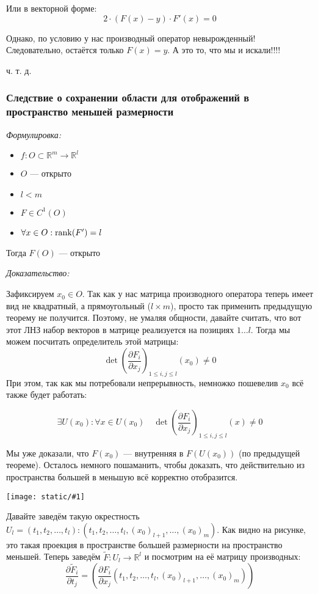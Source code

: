 \documentclass{article}
\def\image#1{\texttt{[image: static/\#1]}}
\begin{document}
Или в векторной форме:
\[2 \cdot (F(x) - y) \cdot F'(x) = 0\]

Однако, по условию у нас производный оператор невырожденный! Следовательно, остаётся только $F(x) = y$. А это то, что мы и искали!!!!

ч. т. д.


\subsubsection{Следствие о сохранении области для отображений в пространство меньшей размерности}
\textit{Формулировка:}

\begin{itemize}
    \item $f: O \subset \mathbb{R}^m \rightarrow \mathbb{R}^l$
    \item $O$ --- открыто
    \item $l < m$    
    \item $F \in C^1(O)$
    \item $\forall x \in O: \rank(F') = l$
\end{itemize}

Тогда $F(O)$ --- открыто

\textit{Доказательство:}

Зафиксируем $x_0 \in O$. Так как у нас матрица производного оператора теперь имеет вид не квадратный, а прямоугольный ($l \times m$), просто так применить предыдущую теорему не получится. Поэтому, не умаляя общности, давайте считать, что вот этот ЛНЗ набор векторов в матрице реализуется на позициях $1 \ldots l$.
Тогда мы можем посчитать определитель этой матрицы: $$\det \left(\frac{\partial F_i}{\partial x_j}\right)_{1 \le i, j \le l}(x_0) \neq 0$$
При этом, так как мы потребовали непрерывность, немножко пошевелив $x_0$ всё также будет работать:

\[\exists U(x_0): \forall x \in U(x_0) \quad \det \left(\frac{\partial F_i}{\partial x_j}\right)_{1 \le i, j \le l}(x) \neq 0\]

Мы уже доказали, что $F(x_0)$ --- внутренняя в $F(U(x_0))$ (по предыдущей теореме). Осталось немного пошаманить, чтобы доказать, что действительно из пространства большей в меньшую всё корректно отобразится.

\image{sohr_obl_men_raz.png}

Давайте заведём такую окрестность $U_l = {(t_1, t_2, \ldots, t_l): (t_1, t_2, \ldots, t_l, (x_0)_{l + 1}, \ldots, (x_0)_m)}$. Как видно на рисунке, это такая проекция в пространстве большей размерности на пространство меньшей. Теперь заведём $\widetilde{F}: U_l \rightarrow \mathbb{R}^l$ и посмотрим на её матрицу производных: $$\frac{\partial \widetilde{F}_i}{\partial t_j} = \left(\frac{\partial F_i}{\partial x_j}(t_1, t_2, \ldots, t_l, (x_0)_{l + 1}, \ldots, (x_0)_m)\right)$$
\end{document}
